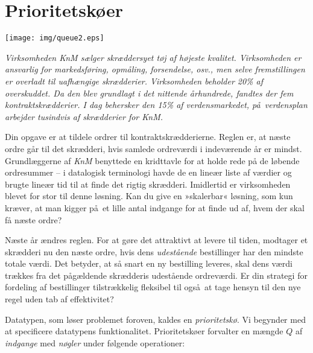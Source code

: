 \chapter{Prioritetskøer}
\label{ch:pq}
\vspace*{-4.5cm}
\begin{flushright}
\texttt{[image: img/queue2.eps]}
\end{flushright}
\vspace*{1cm}

\noindent
{\itshape
Virksomheden \emph{KnM} sælger skræddersyet tøj af højeste kvalitet.
Virksomheden er ansvarlig for markedsføring, opmåling, forsendelse, osv., men selve fremstillingen er overladt til uafhængige skrædderier.
Virksomheden beholder 20\% af overskuddet.
Da den blev grundlagt i det nittende århundrede, fandtes der fem kontraktskrædderier.
I dag behersker den 15\% af verdensmarkedet, på verdensplan arbejder tusindvis af skrædderier for \emph{KnM}.

Din opgave er at tildele ordrer til kontraktskrædderierne.
Reglen er, at næste ordre går til det skrædderi, hvis samlede ordreværdi i indeværende år er mindst.
Grundlæggerne af \emph{KnM} benyttede en kridttavle for at holde rede på de løbende ordresummer -- i datalogisk terminologi havde de en lineær liste af værdier og brugte lineær tid til at finde det rigtig skrædderi.
Imidlertid er virksomheden blevet for stor til denne løsning.
Kan du give en »skalerbar« løsning, som kun kræver, at man kigger på et lille antal indgange for at finde ud af, hvem der skal få næste ordre?

Næste år ændres reglen.
For at gøre det attraktivt at levere til tiden, modtager et skrædderi nu den næste ordre, hvis dens \emph{udestående} bestillinger har den mindste totale værdi.
Det betyder, at så snart en ny bestilling leveres, skal dens værdi trækkes fra det pågældende skrædderis udestående ordreværdi.
Er din strategi for fordeling af bestillinger tilstrækkelig fleksibel til også at tage hensyn til den nye regel uden tab af effektivitet?
}

\setcounter{footnote}{1}

\bigskip\noindent
Datatypen, som løser problemet foroven, kaldes en \emph{prioritetskø}.
Vi begynder med at specificere datatypens funktionalitet.
Prioritetskøer forvalter en mængde $Q$ af \emph{indgange} med \emph{nøgler}
under følgende operationer:
\medskip

